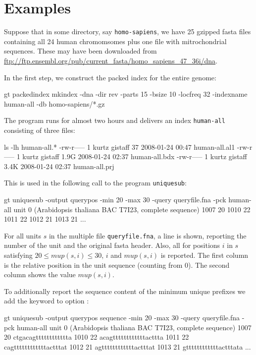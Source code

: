 \documentclass[12pt]{article}
\newcommand{\Uniquesub}[0]{\texttt{uniquesub}\xspace}
\newcommand{\Mup}[1]{\mathit{mup(s,#1)}}
\begin{document}
\section{Examples}

Suppose that in some directory, say \texttt{homo-sapiens}, we have 25 gzipped
fasta files containing all 24 human chromomsomes plus one file with 
mitrochondrial sequences. These may have been downloaded from
\url{ftp://ftp.ensembl.org/pub/current_fasta/homo_sapiens_47_36i/dna}.

In the first step, we construct the packed index for the entire genome:

\begin{Output}
gt packedindex mkindex -dna -dir rev -parts 15 -bsize 10 -locfreq 32
                       -indexname human-all -db homo-sapiens/*.gz
\end{Output}

The program runs for almost two hours and delivers 
an index \texttt{human-all} consisting of three files:

\begin{Output}
ls -lh human-all.*
-rw-r----- 1 kurtz gistaff   37 2008-01-24 00:47 human-all.al1
-rw-r----- 1 kurtz gistaff 1.9G 2008-01-24 02:37 human-all.bdx
-rw-r----- 1 kurtz gistaff 3.4K 2008-01-24 02:37 human-all.prj
\end{Output}

This is used in the following call to the program \Uniquesub:

\begin{Output}
gt uniquesub -output querypos -min 20 -max 30 -query queryfile.fna 
             -pck human-all
unit 0 (Arabidopsis thaliana BAC T7I23, complete sequence)
1007 20
1010 22
1011 22
1012 21
1013 21
...
\end{Output}

For all units \(s\) in the multiple \Fasta file \texttt{queryfile.fna},
a line is shown, reporting the number of the unit and the original fasta
header. Also, all for positions \(i\) in \(s\) satisfying 
\(20\leq \Mup{i}\leq 30\), \(i\) and \(\Mup{i}\) is reported.
The first column is the relative position in the unit sequence (counting
from 0). The second column shows the value \(\Mup{i}\).

To additionally report the sequence content of the
minimum unique prefixes we add the keyword  to option
:

\begin{Output}
gt uniquesub -output querypos sequence -min 20 -max 30 
             -query queryfile.fna -pck human-all
unit 0 (Arabidopsis thaliana BAC T7I23, complete sequence)
1007 20 ctgacagtttttttttttta
1010 22 acagttttttttttttacttta
1011 22 cagttttttttttttactttat
1012 21 agttttttttttttactttat
1013 21 gttttttttttttactttata
...
\end{Output}
\end{document}
